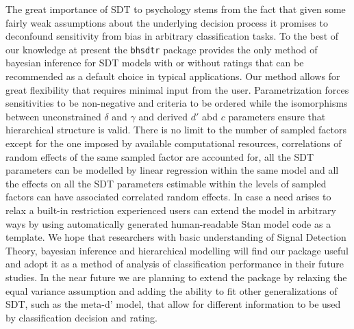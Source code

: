 \documentclass[oneside,a4paper]{article}
\begin{document}
The great importance of SDT to psychology stems from the fact that
given some fairly weak assumptions about the underlying decision
process it promises to deconfound sensitivity from bias in arbitrary
classification tasks. To the best of our knowledge at present the
\texttt{bhsdtr} package provides the only method of bayesian inference
for SDT models with or without ratings that can be recommended as a
default choice in typical applications. Our method allows for great
flexibility that requires minimal input from the user. Parametrization
forces sensitivities to be non-negative and criteria to be ordered
while the isomorphisms between unconstrained $\delta$ and $\gamma$ and
derived $d'$ abd $c$ parameters ensure that hierarchical structure is
valid. There is no limit to the number of sampled factors except for
the one imposed by available computational resources, correlations of
random effects of the same sampled factor are accounted for, all the
SDT parameters can be modelled by linear regression within the same
model and all the effects on all the SDT parameters estimable within
the levels of sampled factors can have associated correlated random
effects. In case a need arises to relax a built-in restriction
experienced users can extend the model in arbitrary ways by using
automatically generated human-readable Stan model code as a
template. We hope that researchers with basic understanding of Signal
Detection Theory, bayesian inference and hierarchical modelling will
find our package useful and adopt it as a method of analysis of
classification performance in their future studies. In the near future
we are planning to extend the package by relaxing the equal variance
assumption and adding the ability to fit other generalizations of SDT,
such as the meta-d' model, that allow for different information to be
used by classification decision and rating.



\end{document}
